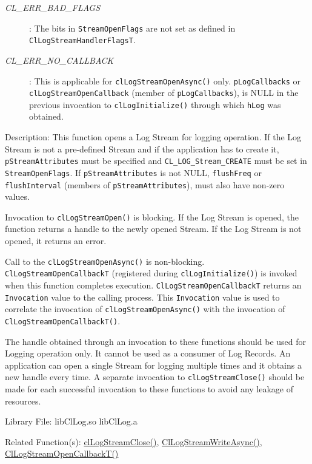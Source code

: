 \begin{flushleft}
\begin{Desc}
\begin{description}
\item[{\em CL\_\-ERR\_\-BAD\_\-FLAGS}]: The bits in {\tt{StreamOpenFlags}} are not set as defined in {\tt{ClLogStreamHandlerFlagsT}}.

\item[{\em CL\_\-ERR\_\-NO\_\-CALLBACK}]: This is applicable for {\tt{clLogStreamOpenAsync()}} only. {\tt{pLogCallbacks}} or {\tt{clLogStreamOpenCallback}}
(member of {\tt{pLogCallbacks}}), is NULL in the previous invocation to {\tt{clLogInitialize()}} through which {\tt{hLog}} was obtained.

\end{description}
\end{Desc}

\begin{Desc}
\item[Description:] This function opens a Log Stream for logging operation. If the Log Stream is not a pre-defined Stream and if the application has to
create it, {\tt{pStreamAttributes}} must be specified and {\tt{CL\_\-LOG\_\-Stream\_\-CREATE}} must be set in {\tt{StreamOpenFlags}}.
If {\tt{pStreamAttributes}} is not NULL, {\tt{flushFreq}} or {\tt{flushInterval}} (members of {\tt{pStreamAttributes}}), must also have non-zero values.
\par
Invocation to {\tt{clLogStreamOpen()}} is blocking. If the Log Stream is opened, the function returns a handle to the newly opened Stream. 
If the Log Stream is not opened, it returns an error.
\par
Call to the {\tt{clLogStreamOpenAsync()}} is non-blocking.  
{\tt{ClLogStreamOpenCallbackT}} (registered during {\tt{clLogInitialize()}}) is invoked when this function completes execution. {\tt{ClLogStreamOpenCallbackT}}
returns an {\tt{Invocation}} value to the calling process. This {\tt{Invocation}} value is used to correlate the invocation of {\tt{clLogStreamOpenAsync()}} with 
the invocation of {\tt{ClLogStreamOpenCallbackT()}}.
\par
The handle obtained through an invocation to these functions should be used for Logging operation only. It cannot be used as a consumer of Log Records.
An application can open a single Stream for logging multiple times and it obtains a new handle every time. A separate invocation to 
{\tt{clLogStreamClose()}} should be made for each successful invocation to these functions to avoid any leakage of resources.

\end{Desc}

\begin{Desc}
\item[Library File:] libClLog.so\newline
libClLog.a\end{Desc}
\begin{Desc}
\item[Related Function(s):]\hyperlink{pagelog108}{clLogStreamClose()}, \hyperlink{pagelog109}{ClLogStreamWriteAsync()},
\hyperlink{pagelog107}{ClLogStreamOpenCallbackT()}\end{Desc}
\newpage







\end{flushleft}
